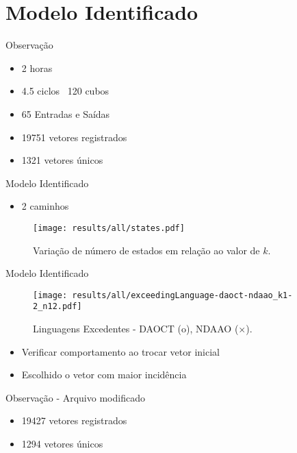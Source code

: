 
\section{Modelo Identificado}


\begin{frame}{Observação}
\begin{itemize}
\item 2 horas 
\item 4.5 ciclos ~120 cubos
\item 65 Entradas e Saídas
\item 19751 vetores registrados
\item 1321 vetores únicos
\end{itemize}\end{frame}


\begin{frame}{Modelo Identificado}
\begin{itemize}
\item 2 caminhos 
\end{itemize}
\begin{figure}[H]
  \centering
  \texttt{[image: results/all/states.pdf]}
  \caption{Variação de número de estados em relação ao valor de $k$.}
    \label{fig:statesIdentOriginal}
\end{figure}
\end{frame}

\begin{frame}{Modelo Identificado}
\begin{figure}[H]
  \centering
  \texttt{[image: results/all/exceedingLanguage-daoct-ndaao\_k1-2\_n12.pdf]}
  \caption{Linguagens Excedentes - DAOCT (o), NDAAO ($\times$).}
    \label{fig:daoctNdaaoOriginal}
\end{figure}
\end{frame}


\begin{frame}
\begin{itemize}
\item Verificar comportamento ao trocar vetor inicial \pause
\item Escolhido o vetor com maior incidência
\end{itemize}
\end{frame}

\begin{frame}{Observação - Arquivo modificado}
\begin{itemize}
\item 19427 vetores registrados
\item 1294 vetores únicos
\end{itemize}
\end{frame}

